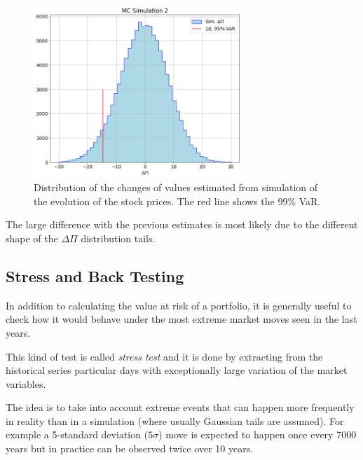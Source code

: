 \begin{figure}[htb]
\centering
\includegraphics[width=0.7\textwidth]{figures/sim2_var}
\caption{Distribution of the changes of values estimated from simulation of the evolution of the stock prices. The red line shows the 99\% VaR.}
\label{fig:mc2_var}
\end{figure}

The large difference with the previous estimates is most likely due to the different shape of the $\Delta\Pi$ distribution tails.

\subsection{Stress and Back Testing}
\label{stress-testing-and-back-testing}

In addition to calculating the value at risk of a portfolio, it is generally useful to check how it would behave under the most extreme market moves seen in the last years.

This kind of test is called \emph{stress test} and it is done by extracting from the historical series particular days with exceptionally large variation of the market variables.
 
The idea is to take into account extreme events that can happen more frequently in reality than in a simulation (where usually Gaussian tails are assumed). For example a 5-standard deviation ($5\sigma$) move is expected to happen once every 7000 years but in practice can be observed twice over 10 years.

